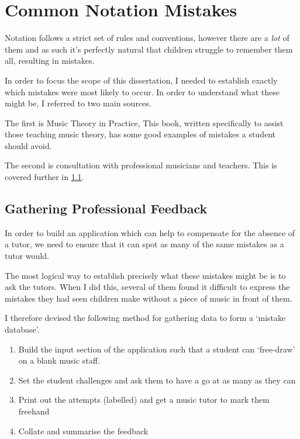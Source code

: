 \section{Common Notation Mistakes}
\label{sec:common-manuscript-mistakes}
Notation follows a strict set of rules and conventions, however there are a \emph{lot} of them and as such it's perfectly natural that children struggle to remember them all, resulting in mistakes.

In order to focus the scope of this dissertation, I needed to establish exactly which mistakes were most likely to occur. In order to understand what these might be, I referred to two main sources.

The first is Music Theory in Practice, \parencite{taylor2008music}  This book, written specifically to assist those teaching music theory, has some good examples of mistakes a student should avoid.

The second is consultation with professional musicians and teachers. This is covered further in \cref{sec:teacher-data-gathering}.

\subsection{Gathering Professional Feedback}
\label{sec:teacher-data-gathering}

In order to build an application which can help to compensate for the absence of a tutor, we need to ensure that it can spot as many of the same mistakes as a tutor would.

The most logical way to establish precisely what these mistakes might be is to ask the tutors. When I did this, several of them found it difficult to express the mistakes they had seen children make without a piece of music in front of them.

I therefore devised the following method for gathering data to form a `mistake database'.

\begin{enumerate}
  \item Build the input section of the application such that a student can `free-draw' on a blank music staff.
  \item Set the student challenges and ask them to have a go at as many as they can
  \item Print out the attempts (labelled) and get a music tutor to mark them freehand
  \item Collate and summarise the feedback
\end{enumerate}

